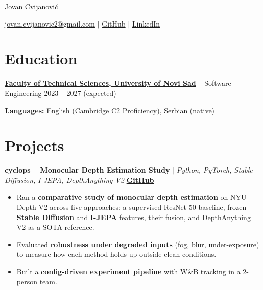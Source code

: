 \documentclass[11pt,letterpaper]{article}
\begin{document}
\centerline{\Huge Jovan Cvijanović}
\vspace{5pt}
\centerline{%
  \href{mailto:jovan.cvijanovic2@gmail.com}{jovan.cvijanovic2@gmail.com} $|$
  \href{https://github.com/AStroCvijo}{GitHub} $|$
  \href{https://linkedin.com/in/jovancvijanovic}{LinkedIn}%
}
\vspace{-7pt}

\section*{Education}

\textbf{\href{http://ftn.uns.ac.rs/691618389/fakultet-tehnickih-nauka}{Faculty of Technical Sciences, University of Novi Sad}} -- Software Engineering \hfill 2023 -- 2027 (expected)

\vspace{0.1cm}

\textbf{Languages:} English (Cambridge C2 Proficiency), Serbian (native)

\vspace{-0.4cm}

\section*{Projects}

\textbf{cyclops -- Monocular Depth Estimation Study} $|$
\textit{Python, PyTorch, Stable Diffusion, I-JEPA, DepthAnything V2} \hfill \href{https://github.com/AStroCvijo/cyclops}{\textbf{GitHub}}
\begin{itemize}[noitemsep,topsep=2pt,leftmargin=*]
    \item Ran a \textbf{comparative study of monocular depth estimation} on NYU Depth V2 across five approaches: a supervised ResNet-50 baseline, frozen \textbf{Stable Diffusion} and \textbf{I-JEPA} features, their fusion, and DepthAnything V2 as a SOTA reference.
    \item Evaluated \textbf{robustness under degraded inputs} (fog, blur, under-exposure) to measure how each method holds up outside clean conditions.
    \item Built a \textbf{config-driven experiment pipeline} with W\&B tracking in a 2-person team.
\end{itemize}

\vspace{0.1cm}
\end{document}
